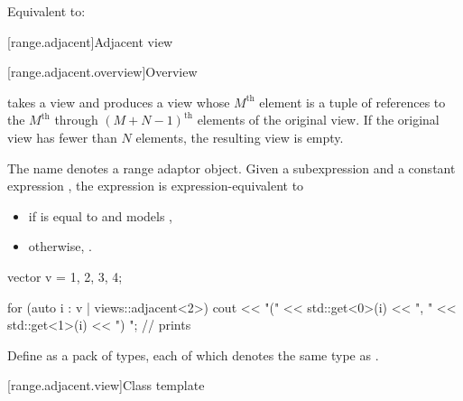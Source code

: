 \begin{itemdescr}
\pnum
\effects
Equivalent to: 
\end{itemdescr}

[range.adjacent]{Adjacent view}

[range.adjacent.overview]{Overview}

\pnum
{} takes a view and
produces a view whose $M^\text{th}$ element is
a tuple of references to
the $M^\text{th}$ through $(M + N - 1)^\text{th}$ elements of
the original view.
If the original view has fewer than $N$ elements, the resulting view is empty.

\pnum
{}%
The name  denotes
a range adaptor object.
Given a subexpression  and a constant expression ,
the expression  is expression-equivalent to
\begin{itemize}
\item
{}
if  is equal to  and
 models ,
\item
otherwise, .
\end{itemize}

\begin{example}
\begin{codeblock}
vector v = {1, 2, 3, 4};

for (auto i : v | views::adjacent<2>) {
  cout << "(" << std::get<0>(i) << ", " << std::get<1>(i) << ") ";  // prints 
}
\end{codeblock}
\end{example}

\pnum
Define  as a pack of  types,
each of which denotes the same type as .

[range.adjacent.view]{Class template }

